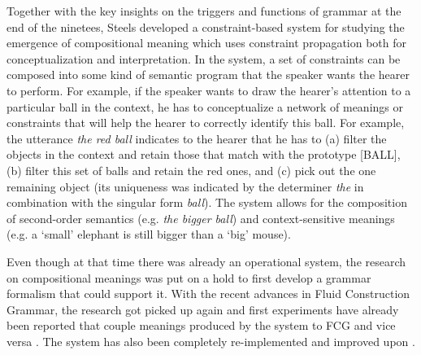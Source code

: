 Together with the key insights on the triggers and functions of grammar at the end of the ninetees, Steels developed a constraint-based system for studying the emergence of compositional meaning \citep{steels00emergence} which uses constraint propagation both for conceptualization and interpretation. In the system, a set of constraints can be composed into some kind of semantic program that the speaker wants the hearer to perform. For example, if the speaker wants to draw the hearer's attention to a particular ball in the context, he has to conceptualize a network of meanings or constraints that will help the hearer to correctly identify this ball. For example, the utterance {\em the red ball} indicates to the hearer that he has to (a) filter the objects in the context and retain those that match with the prototype [BALL], (b) filter this set of balls and retain the red ones, and (c) pick out the one remaining object (its uniqueness was indicated by the determiner {\em the} in combination with the singular form {\em ball}). The system allows for the composition of second-order semantics (e.g. {\em the bigger ball}) and context-sensitive meanings (e.g. a `small' elephant is still bigger than a `big' mouse).

Even though at that time there was already an operational system, the research on compositional meanings was put on a hold to first develop a grammar formalism that could support it. With the recent advances in Fluid Construction Grammar, the research got picked up again and first experiments have already been reported that couple meanings produced by the system to FCG and vice versa \citep{bleys08recursive, steels05planning}. The system has also been completely re-implemented and improved upon \citep[see][for an introduction]{vandenbroeck07constraint, vandenbroeck08constraint}.